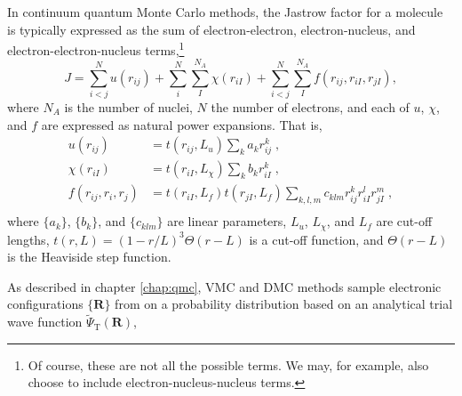 In continuum quantum Monte Carlo methods, the Jastrow factor for a molecule is typically expressed as the sum of electron-electron, electron-nucleus, and electron-electron-nucleus terms,\footnote{Of course, these are not all the possible terms. We may, for example, also choose to include electron-nucleus-nucleus terms.}
\begin{equation}
    \label{eq:jastrow}
    J = \sum_{i<j}^Nu(r_{ij}) + \sum_i^N\sum_I^{N_A}\chi(r_{iI}) + \sum_{i<j}^N\sum_I^{N_A}f(r_{ij}, r_{iI}, r_{jI}),
\end{equation}
where $N_A$ is the number of nuclei, $N$ the number of electrons, and each of $u$, $\chi$, and $f$ are expressed as natural power expansions. That is,
\begin{equation}
\begin{split}
    u(r_{ij})    & = t(r_{ij},L_u)
                    \sum_{k} a_k r_{ij}^k \;, \\
    \chi(r_{iI}) & = t(r_{iI},L_\chi)
                    \sum_{k} b_k r_{iI}^k \;, \\
    f(r_{ij}, r_{i}, r_{j}) & = t(r_{iI},L_f) t(r_{jI},L_f)
                    \sum_{k,l,m} c_{klm}
                        r_{ij}^k r_{iI}^l r_{jI}^m \;, \\
\end{split}
\end{equation}
where $\{a_k\}$, $\{b_k\}$, and $\{c_{klm}\}$ are linear parameters,
$L_u$, $L_\chi$, and $L_f$ are cut-off lengths, $t(r,L) = (1-r/L)^3
\Theta(r-L)$ is a cut-off function, and $\Theta(r-L)$ is the Heaviside
step function.

As described in chapter \ref{chap:qmc}, \gls{VMC} and \gls{DMC} methods sample electronic configurations $\{\mathbf R\}$ from on a probability distribution based on an analytical trial wave function $\tilde\Psi_{\mathrm T}(\mathbf R)$,



